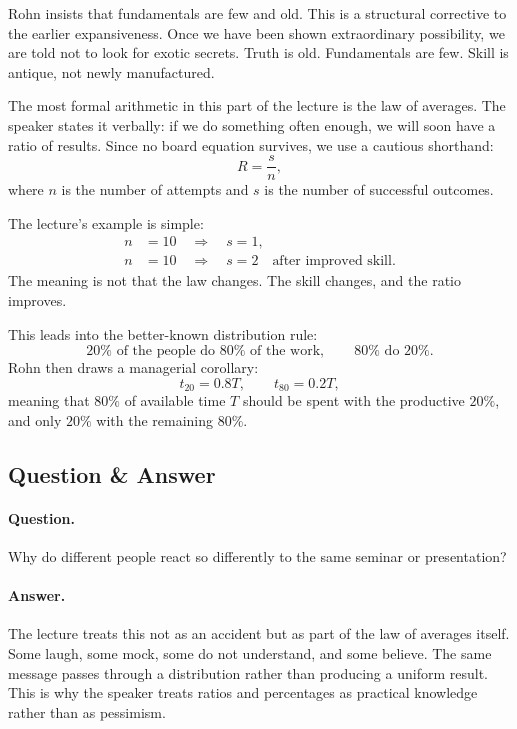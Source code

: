 Rohn insists that fundamentals are few and old. This is a structural corrective to the earlier expansiveness. Once we have been shown extraordinary possibility, we are told not to look for exotic secrets. Truth is old. Fundamentals are few. Skill is antique, not newly manufactured.

The most formal arithmetic in this part of the lecture is the law of averages. The speaker states it verbally: if we do something often enough, we will soon have a ratio of results. Since no board equation survives, we use a cautious shorthand:
\begin{equation}
R=\frac{s}{n},
\end{equation}
where \(n\) is the number of attempts and \(s\) is the number of successful outcomes.

The lecture's example is simple:
\begin{align}
n&=10 \quad \Longrightarrow \quad s=1,\\
n&=10 \quad \Longrightarrow \quad s=2 \quad \text{after improved skill}.
\end{align}
The meaning is not that the law changes. The skill changes, and the ratio improves.

This leads into the better-known distribution rule:
\begin{equation}
20\%\text{ of the people do }80\%\text{ of the work},\qquad
80\%\text{ do }20\%.
\end{equation}
Rohn then draws a managerial corollary:
\begin{equation}
t_{20}=0.8T, \qquad t_{80}=0.2T,
\end{equation}
meaning that \(80\%\) of available time \(T\) should be spent with the productive \(20\%\), and only \(20\%\) with the remaining \(80\%\).

\subsection{Question \& Answer}

\paragraph{Question.} Why do different people react so differently to the same seminar or presentation?

\paragraph{Answer.} The lecture treats this not as an accident but as part of the law of averages itself. Some laugh, some mock, some do not understand, and some believe. The same message passes through a distribution rather than producing a uniform result. This is why the speaker treats ratios and percentages as practical knowledge rather than as pessimism.

